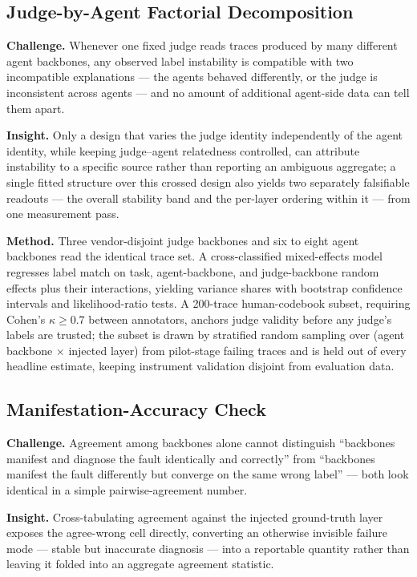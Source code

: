\documentclass[11pt]{article}
\begin{document}
\subsection{Judge-by-Agent Factorial Decomposition}
\textbf{Challenge.} Whenever one fixed judge reads traces produced by many different agent backbones, any observed label instability is compatible with two incompatible explanations --- the agents behaved differently, or the judge is inconsistent across agents --- and no amount of additional agent-side data can tell them apart.

\textbf{Insight.} Only a design that varies the judge identity independently of the agent identity, while keeping judge--agent relatedness controlled, can attribute instability to a specific source rather than reporting an ambiguous aggregate; a single fitted structure over this crossed design also yields two separately falsifiable readouts --- the overall stability band and the per-layer ordering within it --- from one measurement pass.

\textbf{Method.} Three vendor-disjoint judge backbones and six to eight agent backbones read the identical trace set. A cross-classified mixed-effects model regresses label match on task, agent-backbone, and judge-backbone random effects plus their interactions, yielding variance shares with bootstrap confidence intervals and likelihood-ratio tests. A 200-trace human-codebook subset, requiring Cohen's $\kappa \geq 0.7$ between annotators, anchors judge validity before any judge's labels are trusted; the subset is drawn by stratified random sampling over (agent backbone $\times$ injected layer) from pilot-stage failing traces and is held out of every headline estimate, keeping instrument validation disjoint from evaluation data.

\subsection{Manifestation-Accuracy Check}
\textbf{Challenge.} Agreement among backbones alone cannot distinguish ``backbones manifest and diagnose the fault identically and correctly'' from ``backbones manifest the fault differently but converge on the same wrong label'' --- both look identical in a simple pairwise-agreement number.

\textbf{Insight.} Cross-tabulating agreement against the injected ground-truth layer exposes the agree-wrong cell directly, converting an otherwise invisible failure mode --- stable but inaccurate diagnosis --- into a reportable quantity rather than leaving it folded into an aggregate agreement statistic.
\end{document}
